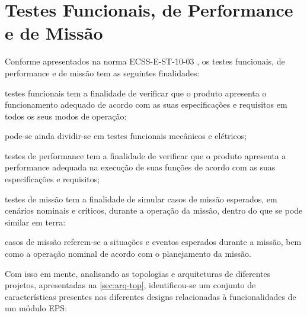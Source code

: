 \section{Testes Funcionais, de Performance e de Missão} \label{sec:analises-testes}

Conforme apresentados na norma ECSS-E-ST-10-03 \cite{ecss-e-st-10-03}, os testes funcionais, de performance e de missão tem as seguintes finalidades:

\begin{alineas}
    \item testes funcionais tem a finalidade de verificar que o produto apresenta o funcionamento adequado de acordo com as suas especificações e requisitos em todos os seus modos de operação:
    \begin{alineas}
        \item pode-se ainda dividir-se em testes funcionais mecânicos e elétricos;
    \end{alineas}
    \item testes de performance tem a finalidade de verificar que o produto apresenta a performance adequada na execução de suas funções de acordo com as suas especificações e requisitos;
    \item testes de missão tem a finalidade de simular casos de missão esperados, em cenários nominais e críticos, durante a operação da missão, dentro do que se pode similar em terra:
    \begin{alineas}
        \item casos de missão referem-se a situações e eventos esperados durante a missão, bem como a operação nominal de acordo com o planejamento da missão.
    \end{alineas}
\end{alineas}

Com isso em mente, analisando as topologias e arquiteturas de diferentes projetos, apresentadas na \autoref{sec:arq-top}, identificou-se um conjunto de características presentes nos diferentes designs relacionadas à funcionalidades de um módulo \gls{EPS}:

